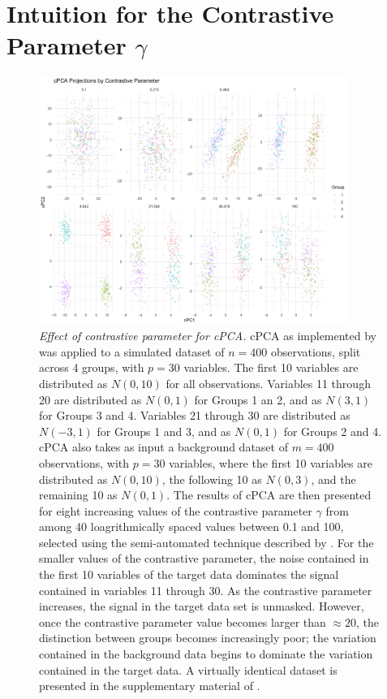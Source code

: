 \documentclass{article}
\begin{document}
\newpage

\section{Intuition for the Contrastive Parameter $\gamma$}

\begin{figure}[!htbp]
    \centering
    \includegraphics[width=0.9\textwidth]{figures/cpca_example_plot}
    \caption{
    {\em Effect of contrastive parameter for cPCA.}
    cPCA as implemented by \citet{Abid2018} was applied to a simulated dataset
    of $n=400$ observations, split across 4 groups, with $p=30$ variables. The
    first 10 variables are distributed as $N(0, 10)$ for all observations. Variables 11  through 20 are distributed as $N(0, 1)$ for Groups 1 an 2,
    and as $N(3, 1)$
    for Groups 3 and 4. Variables 21 through 30 are distributed as $N(-3, 1)$
    for Groups 1 and 3, and as $N(0, 1)$ for Groups 2 and 4. cPCA also takes
    as input a background dataset of $m=400$ observations, with $p=30$
    variables, where the first 10 variables are distributed as $N(0, 10)$, the
    following 10 as $N(0, 3)$, and the remaining 10 as $N(0, 1)$. The results
    of cPCA are then presented for eight increasing values of the contrastive
    parameter $\gamma$ from among 40 loagrithmically spaced values between 0.1 and 100, selected using the semi-automated technique described by \citet{Abid2018}. For the smaller values of the contrastive parameter, the
    noise contained in the first 10 variables of the target data dominates the
    signal contained in variables 11 through 30. As the contrastive parameter
    increases, the signal in the target data set is unmasked. However, once the
    contrastive parameter value becomes larger than $\approx 20$, the
    distinction between groups becomes increasingly poor; the variation
    contained in the background data begins to dominate the variation contained
    in the target data. A virtually identical dataset is presented in the
    supplementary material of \citet{Abid2018}.}
    \label{contrastive_par}
\end{figure}
\end{document}
